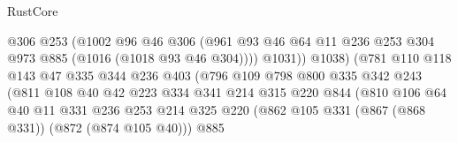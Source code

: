 \begin{lexlean}{RustCore}
\begin{coremodule}
                                      @306
                                      @253
                                      (@1002
                                        @96
                                        @46
                                        @306
                                        (@961
                                          @93
                                          @46
                                          @64
                                          @11
                                          @236
                                          @253
                                          @304
                                          @973
                                          @885
                                          (@1016 (@1018 @93 @46 @304))))
                                      @1031))
                                  @1038)
                                (@781
                                  @110
                                  @118
                                  @143
                                  @47
                                  @335
                                  @344
                                  @236
                                  @403
                                  (@796
                                    @109
                                    @798
                                    @800
                                    @335
                                    @342
                                    @243
                                    (@811
                                      @108
                                      @40
                                      @42
                                      @223
                                      @334
                                      @341
                                      @214
                                      @315
                                      @220
                                      @844
                                      (@810
                                        @106
                                        @64
                                        @40
                                        @11
                                        @331
                                        @236
                                        @253
                                        @214
                                        @325
                                        @220
                                        (@862 @105 @331 (@867 (@868 @331)) (@872 (@874 @105 @40)))
                                        @885

\end{coremodule}
\end{lexlean}
